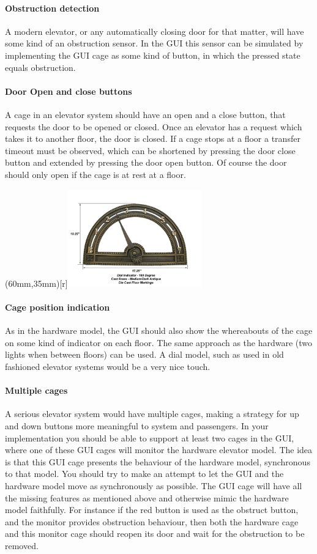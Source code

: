 \paragraph{Obstruction detection} A modern elevator, or any
automatically closing door for that matter, will have some kind of an 
obstruction sensor. In the GUI this sensor can be simulated by
implementing the GUI cage as some kind of button, in which the pressed
state equals obstruction.

\paragraph{Door Open and close buttons} A cage in an elevator system should
have an open and a close button, that requests the door to be opened
or closed. Once an elevator has a request which takes it to another
floor, the door is closed. If a cage stops at a floor a transfer
timeout must be observed, which can be shortened by pressing the door
close button and extended by pressing the door open button. Of course
the door should only open if the cage is at rest at a floor.

\parpic(60mm,35mm)[r]{\includegraphics[width=58mm]{figures/180dialbrassnumbers.jpg}}\paragraph{Cage position indication} As in the hardware model, the GUI
should also show the whereabouts of the cage on some kind of indicator
on each floor. The same approach as the hardware (two lights when
between floors) can be used. A dial model, such as used in old
fashioned elevator systems would be a very nice touch.

\paragraph{Multiple cages} A serious elevator system would have multiple
cages, making a strategy for up and down buttons more meaningful to
system and passengers. In your implementation you should be able to
support at least two cages in the GUI, where one of these GUI cages
will monitor the hardware elevator model. The idea is that this GUI cage
presents the behaviour of the hardware model, synchronous to that
model. You should try to make an attempt to let the GUI and the
hardware model move as synchronously as possible. The GUI cage will
have all the missing features as mentioned above and otherwise mimic
the hardware model faithfully. For instance if the red button is used
as the obstruct button, and the monitor provides obstruction
behaviour, then both the hardware cage and this monitor cage should
reopen its door and wait for the obstruction to be removed.  

